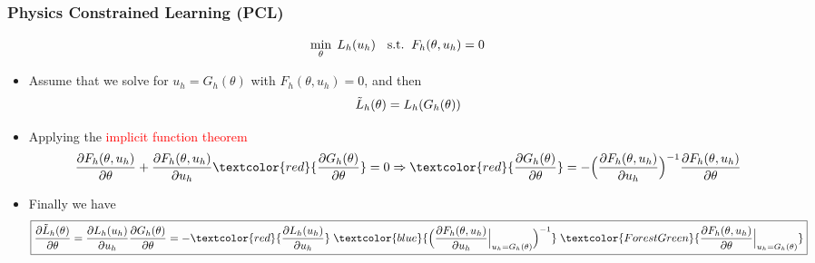 \documentclass[usenames,dvipsnames]{beamer}
\begin{document}
\begin{frame}
	\frametitle{Physics Constrained Learning (PCL)}
	$${\small    \min_{\theta}\; L_h(u_h) \quad \mathrm{s.t.}\;\; F_h(\theta, u_h) = 0}$$
	\begin{itemize}
		\item Assume that we solve for $u_h=G_h(\theta)$ with $F_h(\theta, u_h)=0$, and then
		$${\small\tilde L_h(\theta)  = L_h(G_h(\theta))}$$
		\item Applying the \textcolor{red}{implicit function theorem}
		{  \scriptsize
			\begin{equation*}
				\frac{{\partial {F_h(\theta, u_h)}}}{{\partial \theta }} + {\frac{{\partial {F_h(\theta, u_h)}}}{{\partial {u_h}}}}
				\textcolor{red}{\frac{\partial G_h(\theta)}{\partial \theta}}
				= 0 \Rightarrow
				\textcolor{red}{\frac{\partial G_h(\theta)}{\partial \theta}} =  -\Big( \frac{{\partial {F_h(\theta, u_h)}}}{{\partial {u_h}}} \Big)^{ - 1} \frac{{\partial {F_h(\theta, u_h)}}}{{\partial \theta }}
			\end{equation*}
		}
		\item Finally we have
		{\scriptsize
			\begin{equation*}
				\boxed{\frac{{\partial {{\tilde L}_h}(\theta )}}{{\partial \theta }}
					= \frac{\partial {{ L}_h}(u_h )}{\partial u_h}\frac{\partial G_h(\theta)}{\partial \theta}=
					- \textcolor{red}{ \frac{{\partial {L_h}({u_h})}}{{\partial {u_h}}} } \;
					\textcolor{blue}{ \Big( {\frac{{\partial {F_h(\theta, u_h)}}}{{\partial {u_h}}}\Big|_{u_h = {G_h}(\theta )}} \Big)^{ - 1} } \;
					\textcolor{ForestGreen}{ \frac{{\partial {F_h(\theta, u_h)}}}{{\partial \theta }}\Big|_{u_h = {G_h}(\theta )} }
				}
			\end{equation*}
		}
		
	\end{itemize}
	
\end{frame}
\end{document}

